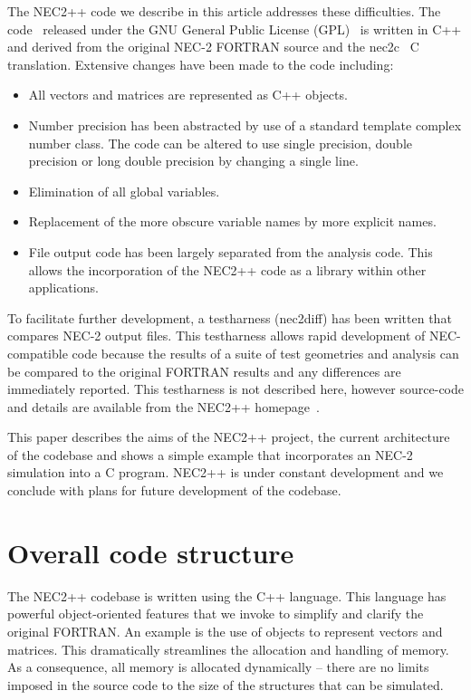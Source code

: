 \documentclass{report}
\begin{document}
The NEC2++ code we describe in this article addresses these difficulties. The code~\cite{NEC_HOMEPAGE} released under the GNU General Public License (GPL)~\cite{GPL} is written in C++ and derived from the original NEC-2 FORTRAN source and the nec2c~\cite{NEC2C} C translation. Extensive changes have been made to the code including:
\begin{itemize}
\item All vectors and matrices are represented as C++ objects. 
\item Number precision has been abstracted by use of a standard template complex number class. The code can be altered to use single precision, double precision or long double precision by changing a single line.
\item Elimination of all global variables.
\item Replacement of the more obscure variable names by more explicit names.
\item File output code has been largely separated from the analysis code. This allows the incorporation of the NEC2++ code as a library within other applications.
\end{itemize}

To facilitate further development, a testharness (nec2diff) has been written that compares NEC-2 output files. This testharness allows rapid development of NEC-compatible code because the results of a suite of test geometries and analysis can be compared to the original FORTRAN results and any differences are immediately reported. This testharness is not described here, however source-code and details are available from the NEC2++ homepage~\cite{NEC_HOMEPAGE}.

This paper describes the aims of the NEC2++ project, the current architecture of the codebase and shows a simple example that incorporates an NEC-2 simulation into a C program. NEC2++ is under constant development and we conclude with plans for future development of the codebase.

\section{Overall code structure}

The NEC2++ codebase is written using the C++ language. This language has powerful object-oriented features that we invoke to simplify and clarify the original FORTRAN. An example is the use of objects to represent vectors and matrices. This dramatically streamlines the allocation and handling of memory. As a consequence, all memory is allocated dynamically -- there are no limits imposed in the source code to the size of the structures that can be simulated.
\end{document}
